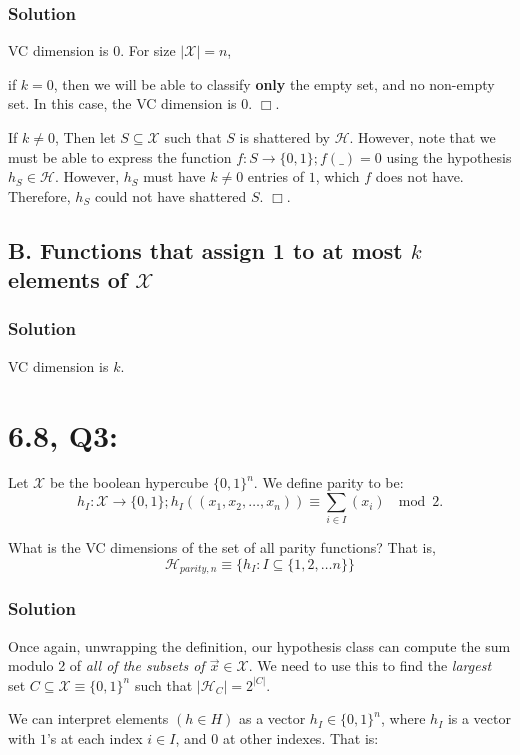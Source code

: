 \documentclass[11pt]{article}
\renewcommand{\H}{\ensuremath{\mathcal{H}}}
\newcommand{\X}{\ensuremath{\mathcal{X}}}
\def\qed{$\Box$}
\begin{document}
\subsubsection*{Solution}
VC dimension is $0$. For size $|\X| = n$,

if $k = 0$, then we will be able to classify \textbf{only} the empty set, and no non-empty set.
In this case, the VC dimension is $0$. \qed.

If $k \neq 0$, Then let $S \subseteq \X$ such that $S$ is shattered by $\H$.
However, note that we must be able to express the function $f: S \rightarrow \{0, 1\}; f(\_) = 0$
using the hypothesis $h_S \in \H$. However, $h_S$ must have $k \neq 0$ entries of $1$,
which $f$ does not have. Therefore, $h_S$ could not have shattered $S$. \qed.


\subsection*{B. Functions that assign 1 to at most $k$ elements of \X}


\subsubsection*{Solution}
VC dimension is $k$.


\section*{6.8, Q3:}
Let $\X$ be the boolean hypercube $\{0, 1\}^n$. We define parity to be:
$$h_I: \X \rightarrow \{0, 1\}; h_I((x_1, x_2, \dots, x_n)) \equiv \sum_{i \in I} (x_i) ~ \mod 2.$$

What is the VC dimensions of the set of all parity functions? That is,
$$\H_{parity, n} \equiv \{ h_I : I \subseteq \{1, 2, \dots n\} \}$$

\subsubsection*{Solution}

Once again, unwrapping the definition, our hypothesis class can compute the
sum modulo 2 of \emph{all of the subsets of $\vec x \in \X$}. We need to
use this to find the \emph{largest} set $C \subseteq \X \equiv \{0, 1\}^n$ such
that $|\H_C| = 2^{|C|}$. 

We can interpret elements $(h \in H)$ as a vector 
$h_I \in \{0, 1\}^n$, where $h_I$ is a vector with $1$'s at each index $i \in I$,
and $0$ at other indexes. That is:
\end{document}
